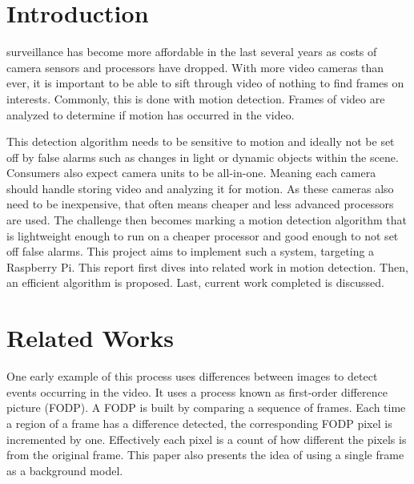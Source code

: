 \documentclass[journal]{IEEEtran}
\begin{document}
    \section{Introduction}
%
%
%
%
     surveillance has become more affordable in the last several years as costs of camera sensors and processors have dropped. With more video cameras than ever, it is important to be able to sift through video of nothing to find
    frames on interests. Commonly, this is done with motion detection. Frames of video are analyzed to determine if motion has
    occurred in the video.

    This detection algorithm needs to be sensitive to motion and ideally not be set off by false alarms such as changes in light or
    dynamic objects within the scene. Consumers also expect camera units to be all-in-one. Meaning each camera
    should handle storing video and analyzing it for motion. As these cameras also need to be inexpensive, that often means cheaper
    and less advanced processors are used. The challenge then becomes marking a motion detection algorithm that is lightweight
    enough to run on a cheaper processor and good enough to not set off false alarms. This project aims to implement such a
    system, targeting a Raspberry Pi. This report first dives into related work in motion detection. Then, an efficient algorithm
    is proposed. Last, current work completed is discussed.

    \section{Related Works}
    One early example \cite{Jain} of this process uses differences between images to detect events occurring in the video. It uses a
    process known as first-order difference picture (FODP). A FODP is built by comparing a sequence of frames. Each time a region
    of a frame has a difference detected, the corresponding FODP pixel is incremented by one. Effectively each pixel is a count of
    how different the pixels is from the original frame. This paper also presents the idea of using a single frame as a background
    model.
\end{document}
